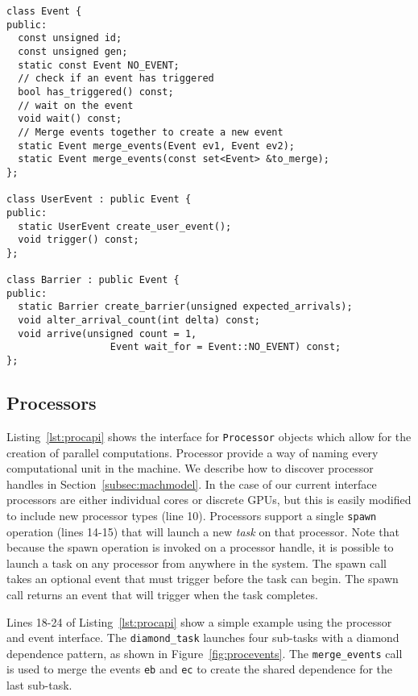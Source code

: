 \begin{lstlisting}[float={t},label={lst:eventapi},caption={Event Interface.}]
class Event {
public:
  const unsigned id;
  const unsigned gen;
  static const Event NO_EVENT;
  // check if an event has triggered
  bool has_triggered() const;
  // wait on the event
  void wait() const;
  // Merge events together to create a new event
  static Event merge_events(Event ev1, Event ev2);
  static Event merge_events(const set<Event> &to_merge);
};

class UserEvent : public Event {
public:
  static UserEvent create_user_event();
  void trigger() const;
};

class Barrier : public Event {
public:
  static Barrier create_barrier(unsigned expected_arrivals);
  void alter_arrival_count(int delta) const;
  void arrive(unsigned count = 1,
                  Event wait_for = Event::NO_EVENT) const;
};
\end{lstlisting}

\subsection{Processors}
\label{subsec:procs}
Listing~\ref{lst:procapi} shows the interface for {\tt Processor} objects which allow for
the creation of parallel computations.  Processor provide a way of naming 
every computational unit in the machine.  We describe how to discover processor handles
in Section~\ref{subsec:machmodel}.  In the case of our current interface 
processors are either individual cores or discrete GPUs, but this is easily modified 
to include new processor types (line 10).   Processors support a single {\tt spawn}
operation (lines 14-15) that will launch a new {\em task} on that processor.
Note that because the spawn operation
is invoked on a processor handle, it is possible to launch a task on any
processor from anywhere in the system.  
The spawn call takes an optional event that must trigger before the task can begin.  
The spawn call returns an event that will trigger when the task completes.

Lines 18-24 of Listing~\ref{lst:procapi} show a simple example using 
the processor and event interface.  The {\tt diamond\_task} launches four
sub-tasks with a diamond dependence pattern, as shown in Figure~\ref{fig:procevents}.
The {\tt merge\_events} call
is used to merge the events {\tt eb} and {\tt ec} to create the shared dependence
for the last sub-task.

